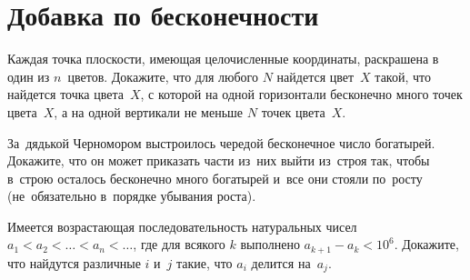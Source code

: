 

\section*{Добавка по бесконечности}


\begin{problems}

\item
Каждая точка плоскости, имеющая целочисленные координаты, раскрашена в один
из $n$~цветов.
Докажите, что для любого $N$ найдется цвет~$X$ такой, что найдется точка
цвета~$X$, с которой на одной горизонтали бесконечно много точек цвета~$X$,
а на одной вертикали не меньше $N$ точек цвета~$X$.

\item
За~дядькой Черномором выстроилось чередой бесконечное число богатырей.
Докажите, что он может приказать части из~них выйти из~строя так, чтобы в~строю
осталось бесконечно много богатырей и~все они стояли по~росту (не~обязательно
в~порядке убывания роста).

\item
Имеется возрастающая последовательность натуральных чисел
$a_{1} < a_{2} < \ldots < a_{n} < \ldots$, где для всякого $k$ выполнено
$a_{k+1} - a_{k} < 10^6$.
Докажите, что найдутся различные $i$ и~$j$ такие, что $a_i$ делится на~$a_j$.

\end{problems}

